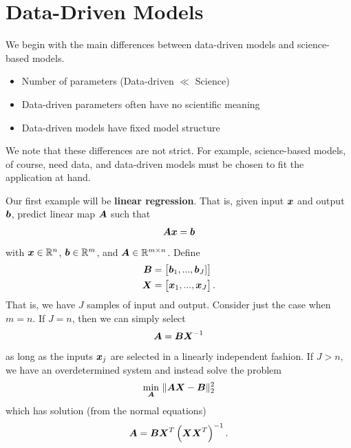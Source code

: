 \section{Data-Driven Models}
We begin with the main differences between data-driven models and science-based models.
\begin{itemize}
    \item Number of parameters (Data-driven $\ll$ Science)
    \item Data-driven parameters often have no scientific meaning
    \item Data-driven models have fixed model structure
\end{itemize}
We note that these differences are not strict. For example, science-based models, of course, need data, and data-driven models must be chosen to fit the application at hand.

Our first example will be \textbf{linear regression}. 
That is, given input $\boldsymbol{x}$ and output $\boldsymbol{b}$, predict linear map $\boldsymbol{A}$ such that
\begin{align} \label{eqn:axb}
\boldsymbol{A} \boldsymbol{x} = \boldsymbol{b}
\end{align}
with $\boldsymbol{x} \in \mathbb{R}^{n}$, $\boldsymbol{b} \in \mathbb{R}^{m}$, and $\boldsymbol{A} \in \mathbb{R}^{m \times n}$. Define
\begin{align*}
    \boldsymbol{B} &= \begin{bmatrix}
    \boldsymbol{b}_1,...,\boldsymbol{b}_{J}] 
    \end{bmatrix} \\
    \boldsymbol{X} &= \begin{bmatrix}
    \boldsymbol{x}_{1}, ..., \boldsymbol{x}_{J}
    \end{bmatrix}.
\end{align*}
That is, we have $J$ samples of input and output. Consider just the case when $m=n$. If $J=n$, then we can simply select
\begin{align} \label{eqn:exactlinreg}
\boldsymbol{A} = \boldsymbol{B} \boldsymbol{X}^{-1}
\end{align}
as long as the inputs $\boldsymbol{x}_{j}$ are selected in a linearly independent fashion. If $J > n$, we have an overdetermined system and instead solve the problem
\begin{align} \label{eqn:overdetlinreg}
    \underset{\boldsymbol{A}}{\textup{min}}\textup{ }\|\boldsymbol{A}\boldsymbol{X} - \boldsymbol{B}\|_{2}^{2}
\end{align}
which has solution (from the normal equations)
\begin{align}
    \boldsymbol{A} = \boldsymbol{B} \boldsymbol{X}^{T} \left(\boldsymbol{X} \boldsymbol{X}^{T}\right)^{-1}.
\end{align}

